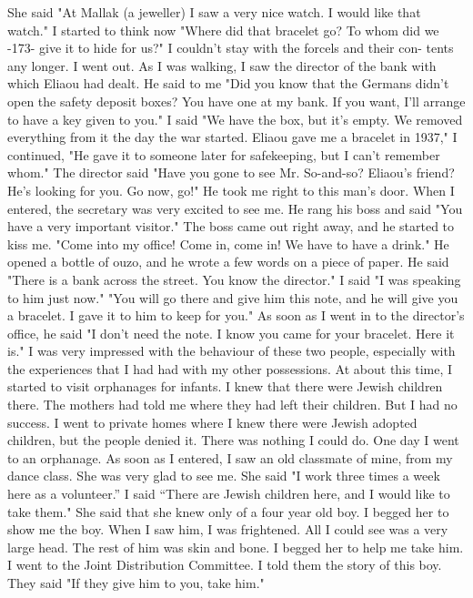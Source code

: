 She said "At Mallak (a jeweller) I saw a very nice watch.
I would like that watch."
I started to think now "Where did that bracelet go?
To whom did we
-173- 
give it to hide for us?"
I couldn't stay with the forcels and their con-
tents any longer.
I went out.
As I was walking, I saw the director of 
the bank with which Eliaou had dealt.
He said to me "Did you know that 
the Germans didn't open the safety deposit boxes?
You have one at my 
bank.
If you want, I'll arrange to have a key given to you."
I said 
"We have the box, but it's empty.
We removed everything from it the day 
the war started.
Eliaou gave me a bracelet in 1937," I continued, "He 
gave it to someone later for safekeeping, but I can't remember whom."
The director said "Have you gone to see Mr.
So-and-so?
Eliaou's 
friend?
He's looking for you.
Go now, go!"
He took me right to this 
man's door.
When I entered, the secretary was very excited to see me.
He rang 
his boss and said "You have a very important visitor."
The boss came out 
right away, and he started to kiss me.
"Come into my office!
Come in, 
come in!
We have to have a drink."
He opened a bottle of ouzo, and he 
wrote a few words on a piece of paper.
He said "There is a bank across 
the street.
You know the director."
I said "I was speaking to him just 
now."
"You will go there and give him this note, and he will give you 
a bracelet.
I gave it to him to keep for you."
As soon as I went in to the director's office, he said "I don't need 
the note.
I know you came for your bracelet.
Here it is."
I was very 
impressed with the behaviour of these two people, especially with the experiences that I had had with my other possessions.
At about this time, I started to visit orphanages for infants.
I 
knew that there were Jewish children there.
The mothers had told me 
where they had left their children.
But I had no success.
I went to 
private homes where I knew there were Jewish adopted children, but the 
people denied it.
There was nothing I could do.
One day I went to an orphanage.
As soon as I entered, I saw an old 
classmate of mine, from my dance class.
She was very glad to see me.
She said "I work three times a week here as a volunteer.” 
I said “There are Jewish children here, and I would like to take them."
She said that 
she knew only of a four year old boy.
I begged her to show me the boy.
When I saw him, I was frightened.
All I could see was a very large head.
The rest of him was skin and bone.
I begged her to help me take him.
I went to the Joint Distribution Committee.
I told them the story 
of this boy.
They said "If they give him to you, take him."
